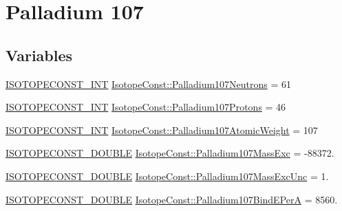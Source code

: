 \hypertarget{group___isotope_const-_palladium-_pd107}{}\section{Palladium 107}
\label{group___isotope_const-_palladium-_pd107}
\subsection*{Variables}
\begin{DoxyCompactItemize}
\item 
\mbox{\hyperlink{group___isotope_const-_macros_ga5f18360b3e99483a35c32d789e62621c}{I\+S\+O\+T\+O\+P\+E\+C\+O\+N\+S\+T\+\_\+\+I\+NT}} \mbox{\hyperlink{group___isotope_const-_palladium-_pd107_ga9bd4b33232c348ff9d4516d6ed833c67}{Isotope\+Const\+::\+Palladium107\+Neutrons}} = 61
\item 
\mbox{\hyperlink{group___isotope_const-_macros_ga5f18360b3e99483a35c32d789e62621c}{I\+S\+O\+T\+O\+P\+E\+C\+O\+N\+S\+T\+\_\+\+I\+NT}} \mbox{\hyperlink{group___isotope_const-_palladium-_pd107_ga8410ea9a5fb77fc15bdec7b6b4a061fd}{Isotope\+Const\+::\+Palladium107\+Protons}} = 46
\item 
\mbox{\hyperlink{group___isotope_const-_macros_ga5f18360b3e99483a35c32d789e62621c}{I\+S\+O\+T\+O\+P\+E\+C\+O\+N\+S\+T\+\_\+\+I\+NT}} \mbox{\hyperlink{group___isotope_const-_palladium-_pd107_ga4927937c4a412dcffb5ecd67699333f0}{Isotope\+Const\+::\+Palladium107\+Atomic\+Weight}} = 107
\item 
\mbox{\hyperlink{group___isotope_const-_macros_ga8f45a7272ce02c0b4c65c44636ed719a}{I\+S\+O\+T\+O\+P\+E\+C\+O\+N\+S\+T\+\_\+\+D\+O\+U\+B\+LE}} \mbox{\hyperlink{group___isotope_const-_palladium-_pd107_gadbb9b7a5b281893ff14ce07ea8547e81}{Isotope\+Const\+::\+Palladium107\+Mass\+Exc}} = -\/88372.
\item 
\mbox{\hyperlink{group___isotope_const-_macros_ga8f45a7272ce02c0b4c65c44636ed719a}{I\+S\+O\+T\+O\+P\+E\+C\+O\+N\+S\+T\+\_\+\+D\+O\+U\+B\+LE}} \mbox{\hyperlink{group___isotope_const-_palladium-_pd107_gaf78483d0378736f4c9039207202fba18}{Isotope\+Const\+::\+Palladium107\+Mass\+Exc\+Unc}} = 1.
\item 
\mbox{\hyperlink{group___isotope_const-_macros_ga8f45a7272ce02c0b4c65c44636ed719a}{I\+S\+O\+T\+O\+P\+E\+C\+O\+N\+S\+T\+\_\+\+D\+O\+U\+B\+LE}} \mbox{\hyperlink{group___isotope_const-_palladium-_pd107_gac4e80b299174791091d7e76ed8dc446c}{Isotope\+Const\+::\+Palladium107\+Bind\+E\+PerA}} = 8560.
\item 

\end{DoxyCompactItemize}

